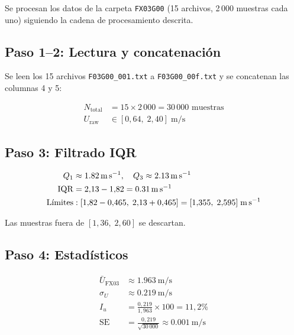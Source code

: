 \documentclass[12pt,a4paper]{article}
\begin{document}
Se procesan los datos de la carpeta \texttt{FX03G00} (15 archivos,
2\,000 muestras cada uno) siguiendo la cadena de procesamiento
descrita.

\subsection{Paso 1--2: Lectura y concatenación}

Se leen los 15 archivos \texttt{F03G00\_001.txt} a
\texttt{F03G00\_00f.txt} y se concatenan las columnas 4 y 5:

\begin{align}
	N_\mathrm{total} & = 15 \times 2\,000 = 30\,000
	\text{ muestras}                                         \\
	U_\mathrm{raw}   & \in [0{,}64,\; 2{,}40]\;\si{\m\per\s}
	\label{eq:ej_raw}
\end{align}

\subsection{Paso 3: Filtrado IQR}

\begin{align}
	Q_1            & \approx \SI{1,82}{\m\per\s}, \quad
	Q_3 \approx \SI{2,13}{\m\per\s}
	\notag                                                    \\
	\mathrm{IQR}   & = 2{,}13 - 1{,}82 = \SI{0,31}{\m\per\s}
	\notag                                                    \\
	\text{Límites} & : [1{,}82 - 0{,}465,\; 2{,}13 + 0{,}465]
	= [1{,}355,\; 2{,}595]\;\si{\m\per\s}
	\label{eq:ej_iqr}
\end{align}

Las muestras fuera de $[1{,}36,\; 2{,}60]$ se descartan.

\subsection{Paso 4: Estadísticos}

\begin{align}
	\bar{U}_\mathrm{FX03} & \approx \SI{1,963}{\m\per\s}
	\label{eq:ej_Umean}                                      \\
	\sigma_{U}            & \approx \SI{0,219}{\m\per\s}
	\label{eq:ej_sigma}                                      \\
	I_u                   & = \frac{0{,}219}{1{,}963}
	\times100 = 11{,}2\%
	\label{eq:ej_Iu}                                         \\
	\mathrm{SE}           & = \frac{0{,}219}{\sqrt{30\,000}}
	\approx \SI{0,001}{\m\per\s}
	\label{eq:ej_SE}
\end{align}
\end{document}
